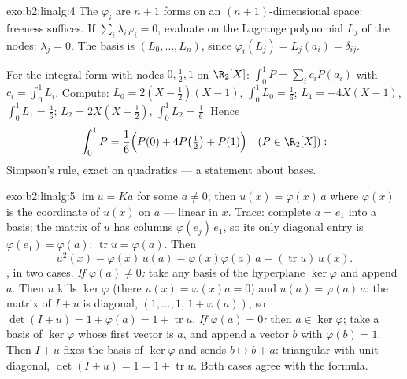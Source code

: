 \begin{solution}{exo:b2:linalg:4}
The $\varphi_i$ are $n + 1$ forms on an $(n+1)$-dimensional space:
freeness suffices. If $\sum_i \lambda_i \varphi_i = 0$, evaluate on
the Lagrange polynomial $L_j$ of the nodes: $\lambda_j = 0$. The
 basis is $(L_0, \dots, L_n)$, since $\varphi_i(L_j) =
L_j(a_i) = \delta_{ij}$.

For the integral form with nodes $0, \frac12, 1$ on $\R_2[X]$:
$\int_0^1 P = \sum_i c_i P(a_i)$ with $c_i = \int_0^1 L_i$. Compute:
$L_0 = 2(X - \tfrac12)(X - 1)$, $\int_0^1 L_0 = \frac16$; $L_1 =
-4X(X-1)$, $\int_0^1 L_1 = \frac46$; $L_2 = 2X(X - \tfrac12)$,
$\int_0^1 L_2 = \frac16$. Hence
\[
\int_0^1 P = \frac{1}{6}\Bigl(P(0) + 4P\bigl(\tfrac12\bigr) +
P(1)\Bigr)
\quad (P \in \R_2[X]) :
\]
Simpson's rule, exact on quadratics --- a statement about 
bases.
\end{solution}

\begin{solution}{exo:b2:linalg:5}
$\operatorname{im} u = Ka$ for some $a \neq 0$; then $u(x) =
\varphi(x)\,a$ where $\varphi(x)$ is the coordinate of $u(x)$ on $a$
--- linear in $x$. Trace: complete $a = e_1$ into a basis; the
matrix of $u$ has columns $\varphi(e_j)\,e_1$, so its only diagonal
entry is $\varphi(e_1) = \varphi(a)$: $\operatorname{tr} u =
\varphi(a)$. Then
\[
u^2(x) = \varphi(x)\, u(a) = \varphi(x)\varphi(a)\, a
= (\operatorname{tr} u)\, u(x).
\]
, in two cases. \emph{If $\varphi(a) \neq 0$:} take any
basis of the hyperplane $\ker\varphi$ and append $a$. Then $u$ kills
$\ker\varphi$ (there $u(x) = \varphi(x)a = 0$) and $u(a) =
\varphi(a)\,a$: the matrix of $I + u$ is diagonal, $(1, \dots, 1,\,
1 + \varphi(a))$, so $\det(I + u) = 1 + \varphi(a) = 1 +
\operatorname{tr} u$. \emph{If $\varphi(a) = 0$:} then $a \in
\ker\varphi$; take a basis of $\ker\varphi$ whose first vector is
$a$, and append a vector $b$ with $\varphi(b) = 1$. Then $I + u$
fixes the basis of $\ker\varphi$ and sends $b \mapsto b + a$:
triangular with unit diagonal, $\det(I + u) = 1 = 1 +
\operatorname{tr} u$. Both cases agree with the formula.
\end{solution}

